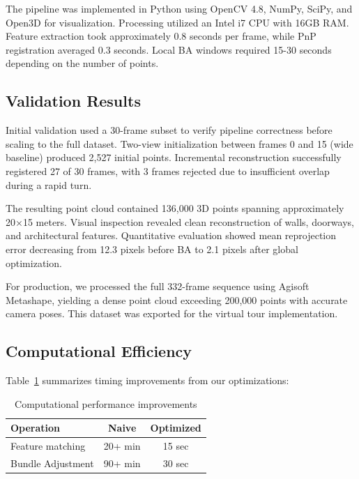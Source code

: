 \documentclass[10pt,twocolumn,letterpaper]{article}
\begin{document}
The pipeline was implemented in Python using OpenCV 4.8, NumPy, SciPy, and Open3D for visualization. Processing utilized an Intel i7 CPU with 16GB RAM. Feature extraction took approximately 0.8 seconds per frame, while PnP registration averaged 0.3 seconds. Local BA windows required 15-30 seconds depending on the number of points.

\subsection{Validation Results}

Initial validation used a 30-frame subset to verify pipeline correctness before scaling to the full dataset. Two-view initialization between frames 0 and 15 (wide baseline) produced 2,527 initial points. Incremental reconstruction successfully registered 27 of 30 frames, with 3 frames rejected due to insufficient overlap during a rapid turn.

The resulting point cloud contained 136,000 3D points spanning approximately 20×15 meters. Visual inspection revealed clean reconstruction of walls, doorways, and architectural features. Quantitative evaluation showed mean reprojection error decreasing from 12.3 pixels before BA to 2.1 pixels after global optimization.

For production, we processed the full 332-frame sequence using Agisoft Metashape, yielding a dense point cloud exceeding 200,000 points with accurate camera poses. This dataset was exported for the virtual tour implementation.

\subsection{Computational Efficiency}

Table~\ref{tab:performance} summarizes timing improvements from our optimizations:

\begin{table}[h]
\centering
\caption{Computational performance improvements}
\label{tab:performance}
\begin{tabular}{lcc}
\toprule
\textbf{Operation} & \textbf{Naive} & \textbf{Optimized} \\
\midrule
Feature matching & 20+ min & 15 sec \\
Bundle Adjustment & 90+ min & 30 sec \\
\bottomrule
\end{tabular}
\end{table}
\end{document}
